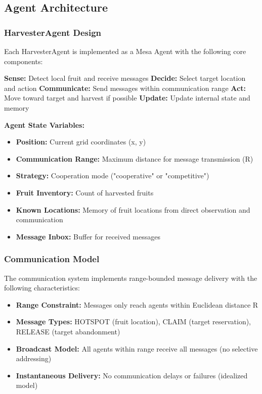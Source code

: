\documentclass[12pt,a4paper]{article}
\begin{document}
\subsection{Agent Architecture}

\subsubsection{HarvesterAgent Design}

Each HarvesterAgent is implemented as a Mesa Agent with the following core components:

\begin{algorithm}
\caption{HarvesterAgent Step Procedure}
\begin{algorithmic}[1]
\STATE \textbf{Sense:} Detect local fruit and receive messages
\STATE \textbf{Decide:} Select target location and action
\STATE \textbf{Communicate:} Send messages within communication range
\STATE \textbf{Act:} Move toward target and harvest if possible
\STATE \textbf{Update:} Update internal state and memory
\end{algorithmic}
\end{algorithm}

\textbf{Agent State Variables:}
\begin{itemize}
    \item \textbf{Position:} Current grid coordinates (x, y)
    \item \textbf{Communication Range:} Maximum distance for message transmission (R)
    \item \textbf{Strategy:} Cooperation mode ("cooperative" or "competitive")
    \item \textbf{Fruit Inventory:} Count of harvested fruits
    \item \textbf{Known Locations:} Memory of fruit locations from direct observation and communication
    \item \textbf{Message Inbox:} Buffer for received messages
\end{itemize}

\subsubsection{Communication Model}

The communication system implements range-bounded message delivery with the following characteristics:

\begin{itemize}
    \item \textbf{Range Constraint:} Messages only reach agents within Euclidean distance R
    \item \textbf{Message Types:} HOTSPOT (fruit location), CLAIM (target reservation), RELEASE (target abandonment)
    \item \textbf{Broadcast Model:} All agents within range receive all messages (no selective addressing)
    \item \textbf{Instantaneous Delivery:} No communication delays or failures (idealized model)
\end{itemize}
\end{document}
